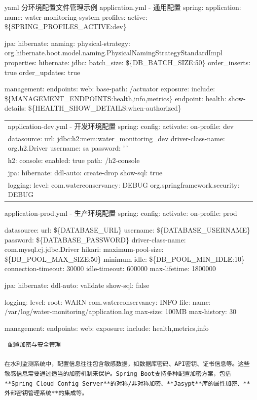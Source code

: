 yaml  分环境配置文件管理示例  application.yml - 通用配置 spring: application: name: water-monitoring-system profiles: active: \$\{SPRING\_PROFILES\_ACTIVE:dev\}

jpa: hibernate: naming: physical-strategy: org.hibernate.boot.model.naming.PhysicalNamingStrategyStandardImpl properties: hibernate: jdbc: batch\_size: \$\{DB\_BATCH\_SIZE:50\} order\_inserts: true order\_updates: true

management: endpoints: web: base-path: /actuator exposure: include: \$\{MANAGEMENT\_ENDPOINTS:health,info,metrics\} endpoint: health: show-details: \$\{HEALTH\_SHOW\_DETAILS:when-authorized\}

\begin{longtable}[]{@{}
  >{\raggedright\arraybackslash}p{}@{}}
\toprule\noalign{}
\endhead
\bottomrule\noalign{}
\endlastfoot
 application-dev.yml - 开发环境配置 spring: config: activate: on-profile: dev \\
datasource: url: jdbc:h2:mem:water\_monitoring\_dev driver-class-name: org.h2.Driver username: sa password: '\,' \\
h2: console: enabled: true path: /h2-console \\
jpa: hibernate: ddl-auto: create-drop show-sql: true \\
logging: level: com.waterconservancy: DEBUG org.springframework.security: DEBUG \\
\end{longtable}

 application-prod.yml - 生产环境配置 spring: config: activate: on-profile: prod

datasource: url: \$\{DATABASE\_URL\} username: \$\{DATABASE\_USERNAME\} password: \$\{DATABASE\_PASSWORD\} driver-class-name: com.mysql.cj.jdbc.Driver hikari: maximum-pool-size: \$\{DB\_POOL\_MAX\_SIZE:50\} minimum-idle: \$\{DB\_POOL\_MIN\_IDLE:10\} connection-timeout: 30000 idle-timeout: 600000 max-lifetime: 1800000

jpa: hibernate: ddl-auto: validate show-sql: false

logging: level: root: WARN com.waterconservancy: INFO file: name: /var/log/water-monitoring/application.log max-size: 100MB max-history: 30

management: endpoints: web: exposure: include: health,metrics,info

\begin{lstlisting}
 配置加密与安全管理

在水利监测系统中，配置信息往往包含敏感数据，如数据库密码、API密钥、证书信息等。这些敏感信息需要通过适当的加密机制来保护。Spring Boot支持多种配置加密方案，包括**Spring Cloud Config Server**的对称/非对称加密、**Jasypt**库的属性加密、**外部密钥管理系统**的集成等。
\end{lstlisting}

